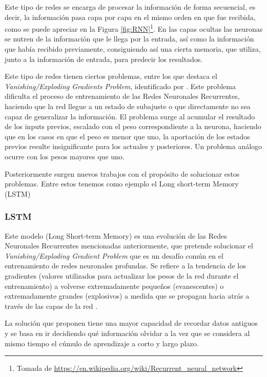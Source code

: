 Este tipo de redes se encarga de procesar la información de forma secuencial, es decir, la información pasa capa por capa en el mismo orden en que fue recibida, como se puede apreciar en la Figura \ref{fig:RNN}\footnote{Tomada de \url{https://en.wikipedia.org/wiki/Recurrent_neural_network}}. En las capas ocultas las neuronas se nutren de la información que le llega por la entrada, así como la información que había recibido previamente, consiguiendo así una cierta memoria, que utiliza, junto a la información de entrada, para predecir los resultados. 

Este tipo de redes tienen ciertos problemas, entre los que destaca el \textit{Vanishing/Exploding Gradients Problem}, identificado por \cite{hochreiter1991untersuchungen}.  Este problema dificulta el proceso de entrenamiento de las Redes Neuronales Recurrentes, haciendo que la red llegue a un estado de subajuste o que directamente no sea capaz de generalizar la información. El problema surge al acumular el resultado de los inputs previos, escalado con el peso correspondiente a la neurona, haciendo que en los casos en que el peso es menor que uno, la aportación de los estados previos resulte insignificante para los actuales y posteriores. Un problema análogo ocurre con los pesos mayores que uno.

Posteriormente surgen nuevos trabajos con el propósito de solucionar estos problemas. Entre estos tenemos como ejemplo el Long short-term Memory (LSTM)

\subsubsection{LSTM}

Este modelo (Long Short-term Memory) \citep{hochreiter1997long}  es una evolución de las Redes Neuronales Recurrentes mencionadas anteriormente, que pretende solucionar el \textit{Vanishing/Exploding Gradient Problem} que es un desafío común en el entrenamiento de redes neuronales profundas. Se refiere a la tendencia de los gradientes (valores utilizados para actualizar los pesos de la red durante el entrenamiento) a volverse extremadamente pequeños (evanescentes) o extremadamente grandes (explosivos) a medida que se propagan hacia atrás a través de las capas de la red \citep{goodfellow2016deep}.

La solución que proponen tiene una mayor capacidad de recordar datos antiguos y se basa en ir decidiendo qué información olvidar a la vez que se considera al mismo tiempo el cúmulo de aprendizaje a corto y largo plazo.

